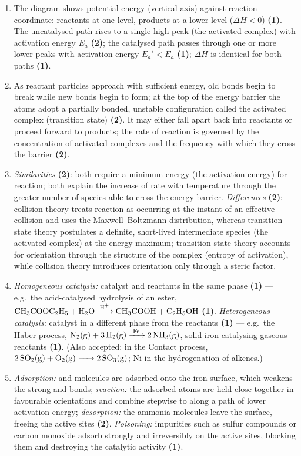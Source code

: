 \documentclass[11pt]{article}
\begin{document}
\begin{corrige}
\begin{enumerate}
\item The diagram shows potential energy (vertical axis) against reaction coordinate: reactants at one level, products at a lower level ($\Delta H < 0$) \textbf{(1)}. The uncatalysed path rises to a single high peak (the activated complex) with activation energy $E_a$ \textbf{(2)}; the catalysed path passes through one or more lower peaks with activation energy $E_a' < E_a$ \textbf{(1)}; $\Delta H$ is identical for both paths \textbf{(1)}.
\item As reactant particles approach with sufficient energy, old bonds begin to break while new bonds begin to form; at the top of the energy barrier the atoms adopt a partially bonded, unstable configuration called the activated complex (transition state) \textbf{(2)}. It may either fall apart back into reactants or proceed forward to products; the rate of reaction is governed by the concentration of activated complexes and the frequency with which they cross the barrier \textbf{(2)}.
\item \emph{Similarities} \textbf{(2)}: both require a minimum energy (the activation energy) for reaction; both explain the increase of rate with temperature through the greater number of species able to cross the energy barrier. \emph{Differences} \textbf{(2)}: collision theory treats reaction as occurring at the instant of an effective collision and uses the Maxwell--Boltzmann distribution, whereas transition state theory postulates a definite, short-lived intermediate species (the activated complex) at the energy maximum; transition state theory accounts for orientation through the structure of the complex (entropy of activation), while collision theory introduces orientation only through a steric factor.
\item \emph{Homogeneous catalysis:} catalyst and reactants in the same phase \textbf{(1)} — e.g.\ the acid-catalysed hydrolysis of an ester, $\ce{CH3COOC2H5 + H2O ->[H+] CH3COOH + C2H5OH}$ \textbf{(1)}. \emph{Heterogeneous catalysis:} catalyst in a different phase from the reactants \textbf{(1)} — e.g.\ the Haber process, $\ce{N2(g) + 3H2(g) ->[Fe] 2NH3(g)}$, solid iron catalysing gaseous reactants \textbf{(1)}. (Also accepted:  in the Contact process, $\ce{2SO2(g) + O2(g) -> 2SO3(g)}$; Ni in the hydrogenation of alkenes.)
\item \emph{Adsorption:}  and  molecules are adsorbed onto the iron surface, which weakens the strong  and  bonds; \emph{reaction:} the adsorbed atoms are held close together in favourable orientations and combine stepwise to  along a path of lower activation energy; \emph{desorption:} the ammonia molecules leave the surface, freeing the active sites \textbf{(2)}. \emph{Poisoning:} impurities such as sulfur compounds or carbon monoxide adsorb strongly and irreversibly on the active sites, blocking them and destroying the catalytic activity \textbf{(1)}.

\end{enumerate}
\end{corrige}
\end{document}
